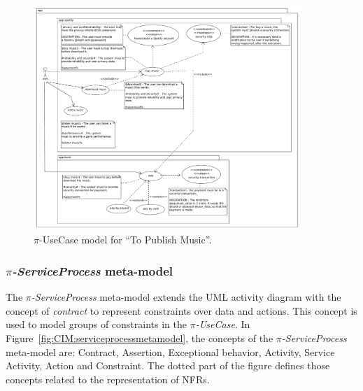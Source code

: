 \documentclass[12pt,twoside]{article}
\theoremstyle{plain}
\theoremstyle{plain}
\begin{document}
\begin{multicols}{2}
\begin{figure}
\center
\includegraphics[width=0.9\textwidth]{UseCase.pdf}
\caption{\label{fig:CIM:piusecasetpm} $\pi$-UseCase model for ``To Publish Music''.}
\end{figure}


\subsubsection{\textit{$\pi$-ServiceProcess} meta-model}%

The \textit{$\pi$-ServiceProcess} meta-model extends the UML activity diagram with the concept of \textit{contract} to represent constraints over data and actions. This concept is used to model
groups  of  constraints  in the \textit{$\pi$-UseCase}.
In Figure~\ref{fig:CIM:serviceprocessmetamodel}, the concepts of the \textit{$\pi$-Ser\-vice\-Process} meta-model are: {\sc Contract}, {\sc Assertion}, {\sc Exceptional behavior}, {\sc Activity}, {\sc Ser\-vice Acti\-vi\-ty}, {\sc Action} and {\sc Constraint}.
The dotted part of the figure defines those concepts related to the representation of NFRs.


\end{multicols}
\end{document}
